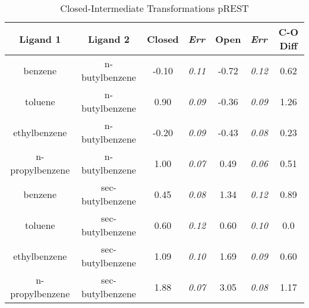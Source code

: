 \documentclass[T4paper.tex]{subfiles}
\begin{document}
\begin{table}[!htb]
\centering
\caption{Closed-Intermediate Transformations pREST}
\label{tbl:C-I_pREST}
\begin{tabular}{|c|c|c|l|c|l|c|}
\hline
\textbf{Ligand 1}                       & \textbf{Ligand 2}                        & {\color[HTML]{800080} \textbf{Closed}} & {\color[HTML]{800080} \textit{Err}} & {\color[HTML]{008000} \textbf{Open}} & {\color[HTML]{008000} \textit{Err}} & \textbf{C-O Diff}            \\ \hline
\cellcolor[HTML]{800080}benzene         & \cellcolor[HTML]{00FFFF}n-butylbenzene   & -0.10                                   & \textit{0.11}                       & -0.72                                & \textit{0.12}                       & \cellcolor[HTML]{FFCCC9}0.62 \\ \hline
\cellcolor[HTML]{800080}toluene         & \cellcolor[HTML]{00FFFF}n-butylbenzene   & 0.90                                  & \textit{0.09}                       & -0.36                                & \textit{0.09}                       & \cellcolor[HTML]{9AFF99}1.26 \\ \hline
\cellcolor[HTML]{800080}ethylbenzene    & \cellcolor[HTML]{00FFFF}n-butylbenzene   & -0.20                                   & \textit{0.09}                       & -0.43                                & \textit{0.08}                       & \cellcolor[HTML]{9AFF99}0.23 \\ \hline
\cellcolor[HTML]{800080}n-propylbenzene & \cellcolor[HTML]{00FFFF}n-butylbenzene   & 1.00                                  & \textit{0.07}                       & 0.49                                 & \textit{0.06}                       & \cellcolor[HTML]{9AFF99}0.51 \\ \hline
\cellcolor[HTML]{800080}benzene         & \cellcolor[HTML]{00FFFF}sec-butylbenzene & 0.45                                   & \textit{0.08}                       & 1.34                                 & \textit{0.12}                       & \cellcolor[HTML]{9AFF99}0.89 \\ \hline
\cellcolor[HTML]{800080}toluene         & \cellcolor[HTML]{00FFFF}sec-butylbenzene & 0.60                                   & \textit{0.12}                       & 0.60                                 & \textit{0.10}                       & \cellcolor[HTML]{9AFF99}0.0 \\ \hline
\cellcolor[HTML]{800080}ethylbenzene    & \cellcolor[HTML]{00FFFF}sec-butylbenzene & 1.09                                   & \textit{0.10}                       & 1.69                                 & \textit{0.09}                       & \cellcolor[HTML]{9AFF99}0.60 \\ \hline
\cellcolor[HTML]{800080}n-propylbenzene & \cellcolor[HTML]{00FFFF}sec-butylbenzene & 1.88                                   & \textit{0.07}                       & 3.05                                 & \textit{0.08}                       & \cellcolor[HTML]{9AFF99}1.17 \\ \hline
\end{tabular}
\end{table}
\end{document}
